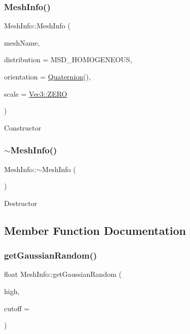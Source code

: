 \subsubsection{\texorpdfstring{Mesh\+Info()}{MeshInfo()}\hspace{0.1cm}{\footnotesize\ttfamily [2/2]}}
{\footnotesize\ttfamily Mesh\+Info\+::\+Mesh\+Info (\begin{DoxyParamCaption}\item[{const std\+::string \&}]{mesh\+Name,  }\item[{const \hyperlink{classMeshInfo_aadc99105abbc3bd033e33c6ba512a13b}{Mesh\+Surface\+Distribution}}]{distribution = {\ttfamily MSD\+\_\+HOMOGENEOUS},  }\item[{const \hyperlink{classQuaternion}{Quaternion} \&}]{orientation = {\ttfamily \hyperlink{classQuaternion}{Quaternion}()},  }\item[{const \hyperlink{classVec3}{Vec3} \&}]{scale = {\ttfamily \hyperlink{classVec3_a26c0c52a5fba36ed0ef5e6d5026569f4}{Vec3\+::\+Z\+E\+RO}} }\end{DoxyParamCaption})}

Constructor \mbox{\label{classMeshInfo_aff7c5864479b8923d156aa04f27dfb3b}} 
\subsubsection{\texorpdfstring{$\sim$\+Mesh\+Info()}{~MeshInfo()}\hspace{0.1cm}{\footnotesize\ttfamily [2/2]}}
{\footnotesize\ttfamily Mesh\+Info\+::$\sim$\+Mesh\+Info (\begin{DoxyParamCaption}\item[{void}]{ }\end{DoxyParamCaption})}

Destructor 

\subsection{Member Function Documentation}
\mbox{\label{classMeshInfo_a1414c8a370c9878dafb0757c99d3b737}} 
\subsubsection{\texorpdfstring{get\+Gaussian\+Random()}{getGaussianRandom()}\hspace{0.1cm}{\footnotesize\ttfamily [1/2]}}
{\footnotesize\ttfamily float Mesh\+Info\+::get\+Gaussian\+Random (\begin{DoxyParamCaption}\item[{float}]{high,  }\item[{float}]{cutoff = {} }\end{DoxyParamCaption})\hspace{0.3cm}{\ttfamily [inline]}}

